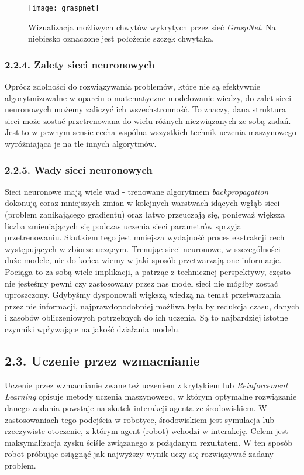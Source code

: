 \documentclass{article}
\begin{document}
\begin{figure}[h]
\centering
\texttt{[image: graspnet]}
\caption{Wizualizacja możliwych chwytów wykrytych przez sieć \emph{GraspNet}. Na niebiesko oznaczone jest położenie szczęk chwytaka.}
\end{figure}

\subsubsection*{\Large{2.2.4. Zalety sieci neuronowych}}
Oprócz zdolności do rozwiązywania problemów, które nie są efektywnie algorytmizowalne w oparciu o matematyczne modelowanie wiedzy, do zalet sieci neuronowych możemy zaliczyć ich wszechstronność. To znaczy, dana struktura sieci może zostać przetrenowana do wielu różnych niezwiązanych ze sobą zadań. Jest to w pewnym sensie cecha wspólna wszystkich technik uczenia maszynowego wyróżniająca je na tle innych algorytmów.

\subsubsection*{\Large{2.2.5. Wady sieci neuronowych}}
Sieci neuronowe mają wiele wad - trenowane algorytmem \emph{backpropagation} dokonują coraz mniejszych zmian w kolejnych warstwach idących wgłąb sieci (problem zanikającego gradientu) oraz łatwo przeuczają się, ponieważ większa liczba zmieniających się podczas uczenia sieci parametrów sprzyja przetrenowaniu. Skutkiem tego jest mniejsza wydajność proces ekstrakcji cech występujących w zbiorze uczącym. Trenując sieci neuronowe, w szczególności duże modele, nie do końca wiemy w jaki sposób przetwarzają one informacje. Pociąga to za sobą wiele implikacji, a patrząc z technicznej perspektywy, często nie jesteśmy pewni czy zastosowany przez nas model sieci nie mógłby zostać uproszczony. Gdybyśmy dysponowali większą wiedzą na temat przetwarzania przez nie informacji, najprawdopodobniej możliwa była by redukcja czasu, danych i zasobów obliczeniowych potrzebnych do ich uczenia. Są to najbardziej istotne czynniki wpływające na jakość działania modelu.

\subsection*{\LARGE{2.3. Uczenie przez wzmacnianie}} 

Uczenie przez wzmacnianie zwane też uczeniem z krytykiem lub \emph{Reinforcement Learning} opisuje metody uczenia maszynowego, w którym optymalne rozwiązanie danego zadania powstaje na skutek interakcji agenta ze środowiskiem. W zastosowaniach tego podejścia w robotyce, środowiskiem jest symulacja lub rzeczywiste otoczenie, z którym agent (robot) wchodzi w interakcję. Celem jest maksymalizacja zysku ściśle związanego z pożądanym rezultatem. W ten sposób robot próbując osiągnąć jak najwyższy wynik uczy się rozwiązywać zadany problem.
\end{document}
